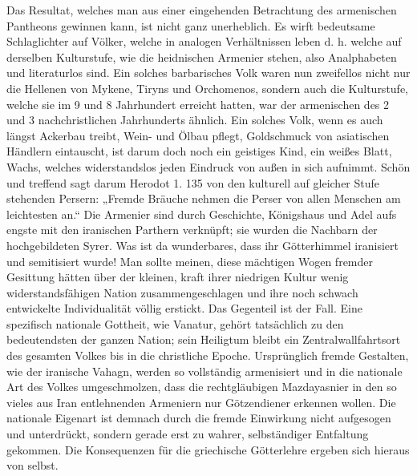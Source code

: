 \documentclass{article}
\begin{document}
Das Resultat, welches man aus einer eingehenden Betrachtung des armenischen Pantheons gewinnen kann, ist nicht ganz unerheblich. Es wirft bedeutsame Schlaglichter auf Völker, welche in analogen Verhältnissen leben d. h. welche auf derselben Kulturstufe, wie die heidnischen Armenier stehen, also Analphabeten und literaturlos sind. Ein solches barbarisches Volk waren nun zweifellos nicht nur die Hellenen von Mykene, Tiryns und Orchomenos, sondern auch die Kulturstufe, welche sie im 9 und 8 Jahrhundert erreicht hatten, war der armenischen des 2 und 3 nachchristlichen Jahrhunderts ähnlich. Ein solches Volk, wenn es auch längst Ackerbau treibt, Wein- und Ölbau pflegt, Goldschmuck von asiatischen Händlern eintauscht, ist darum doch noch ein geistiges Kind, ein weißes Blatt, Wachs, welches widerstandslos jeden Eindruck von außen in sich aufnimmt. Schön und treffend sagt darum Herodot 1. 135 von den kulturell auf gleicher Stufe stehenden Persern: „Fremde Bräuche nehmen die Perser von allen Menschen am leichtesten an.“ Die Armenier sind durch Geschichte, Königshaus und Adel aufs engste mit den iranischen Parthern verknüpft; sie wurden die Nachbarn der hochgebildeten Syrer. Was ist da wunderbares, dass ihr Götterhimmel iranisiert und semitisiert wurde! Man sollte meinen, diese mächtigen Wogen fremder Gesittung hätten über der kleinen, kraft ihrer niedrigen Kultur wenig widerstandsfähigen Nation zusammengeschlagen und ihre noch schwach entwickelte Individualität völlig erstickt. Das Gegenteil ist der Fall. Eine spezifisch nationale Gottheit, wie Vanatur, gehört tatsächlich zu den bedeutendsten der ganzen Nation; sein Heiligtum bleibt ein Zentralwallfahrtsort des gesamten Volkes bis in die christliche Epoche. Ursprünglich fremde Gestalten, wie der iranische Vahagn, werden so vollständig armenisiert und in die nationale Art des Volkes umgeschmolzen, dass die rechtgläubigen Mazdayasnier in den so vieles aus Iran entlehnenden Armeniern nur Götzendiener erkennen wollen. Die nationale Eigenart ist demnach durch die fremde Einwirkung nicht aufgesogen und unterdrückt, sondern gerade erst zu wahrer, selbständiger Entfaltung gekommen. Die Konsequenzen für die griechische Götterlehre ergeben sich hieraus von selbst.
\clearpage
\end{document}
